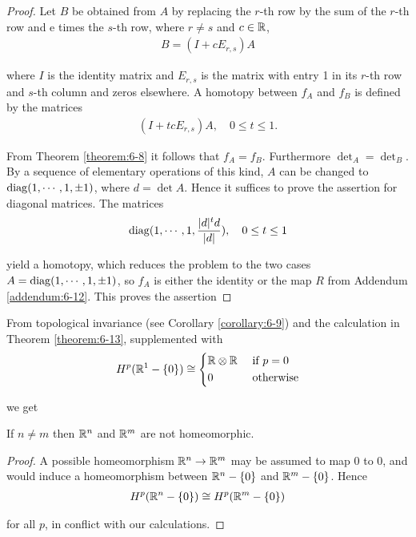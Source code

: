 \begin{proof}
  Let $B$ be obtained from $A$ by replacing the $r$-th row by the sum of the
$r$-th row and e times the $s$-th row, where $r \neq s$ and $c\in\mathbb{R}$,
\begin{align*}
  B = (I + cE_{r, s})A
\end{align*}

where $I$ is the identity matrix and $E_{r,s}$ is the matrix with entry 1 in its $r$-th row
and $s$-th column and zeros elsewhere. A homotopy between $f_A$ and $f_B$ is defined
by the matrices
\begin{align*}
  (I+tcE_{r, s})A, \quad 0\le t\le 1.
\end{align*}

From Theorem \ref{theorem:6-8} it follows that $f_A = f_B$. Furthermore $\det_A = \det_B$.
By a sequence of elementary operations of this kind, $A$ can be changed to
$\mathrm{diag} (1, \cdots, 1, \pm 1)$, where $d =\det A$. Hence it suffices to prove the assertion for
diagonal matrices. The matrices
\begin{align*}
  \mathrm{diag}(1, \cdots, 1, \frac{|d|^td}{|d|}), \quad 0\le t\le 1
\end{align*}

yield a homotopy, which reduces the problem to the two cases $A = \mathrm{diag} (1, \cdots, 1, \pm 1)$, so $f_A$ is 
either the identity or the map $R$ from Addendum \ref{addendum:6-12}. This proves the assertion
\end{proof}


From topological invariance (see Corollary \ref{corollary:6-9}) and the calculation in Theorem
\ref{theorem:6-13}, supplemented with
\begin{align*}
  H^p(\mathbb{R}^1 - \{0\}) \cong \left\{\begin{aligned}
    & \mathbb{R}\otimes\mathbb{R} && \text{ if } p=0\\
    & 0 && \text{ otherwise}
  \end{aligned}\right.
\end{align*}

we get 
\begin{proposition}\label{proposition:6-15}
  If $n \neq m$ then $\mathbb{R}^n$ and $\mathbb{R}^m$ are not homeomorphic.
\end{proposition}

\begin{proof}
  A possible homeomorphism $\mathbb{R}^n\to\mathbb{R}^m$ may be assumed to map 0 to 0, and would induce a homeomorphism 
  between $\mathbb{R}^n-\{0\}$ and $\mathbb{R}^m-\{0\}$. Hence
  \begin{align*}
    H^p(\mathbb{R}^n - \{0\}) \cong H^p(\mathbb{R}^m - \{0\})
  \end{align*}

  for all $p$, in conflict with our calculations.
\end{proof}

